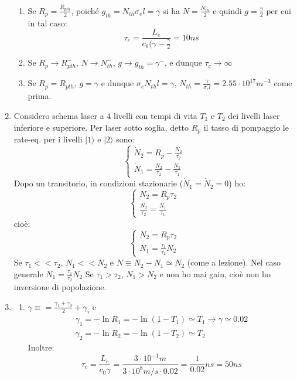 \documentclass{book}
\def \s {\sigma}
\newcommand{\lv}[1]{$|#1\rangle$}
\theoremstyle{remark}
\begin{document}
\begin{enumerate}
\begin{enumerate}
\item Se $R_p = \frac{R_{p th}}{2}$, poiché $g_{th} = N_{th} \s_e l = \gamma$ si ha $N = \frac{N_{th}}{2}$ e quindi $g =\frac{\gamma}{2}$ per cui in tal caso:
\begin{equation*}
\tau_c = \frac{L_e}{c_0(\gamma - \frac{\gamma}{2}} = 10 ns
\end{equation*}
\item Se $R_p \rightarrow R_{p th}^-$, $N\rightarrow N_{th}^-$, $g \rightarrow g_{th} = \gamma^-$, e dunque $\tau_c \rightarrow \infty$ 
\item Se $R_p = R_{p th}$, $g = \gamma$ e dunque $\s_e N_{th}l=\gamma$, $N_{th}=\frac{\gamma}{\s_e l} = 2.55 \cdot 10^{17} m^{-3}$ come prima.
\end{enumerate}

\item Considero schema laser a 4 livelli con tempi di vita $T_1$ e $T_2$ dei livelli laser inferiore e superiore.
Per laser sotto soglia, detto $R_p$ il tasso di pompaggio le rate-eq. per i livelli \lv{1} e \lv{2} sono:
\begin{equation*}
\begin{cases}
\dot{N}_2 = R_p - \frac{N_2}{\tau_2}\\
\dot{N}_1 = \frac{N_2}{\tau_2} - \frac{N_1}{\tau_1}
\end{cases}
\end{equation*}
Dopo un transitorio, in condizioni stazionarie ($\dot{N}_1 = \dot{N}_2 = 0$) ho:
\begin{equation*}
\begin{cases}
N_2 = R_p\tau_2\\
\frac{N_2}{\tau_2} = \frac{N_1}{\tau_1}
\end{cases}
\end{equation*}
cioè:
\begin{equation*}
\begin{cases}
N_2 = R_p\tau_2\\
N_1 = \frac{\tau_1}{\tau_2} N_2
\end{cases}
\end{equation*}
Se $\tau_1 << \tau_2$, $N_1 << N_2$ e $N \equiv N_2 - N_1 \simeq N_2$ (come a lezione).
Nel caso generale $N_1 = \frac{\tau_1}{\tau_2} N_2$ Se $\tau_1 > \tau_2$, $N_1 > N_2$ e non ho mai gain, cioè non ho inversione di popolazione.

\item %
\begin{enumerate}
\item $\gamma \equiv = \frac{\gamma_1 + \gamma_2}{2} + \gamma_i$ e
\begin{align*}
\gamma_1 = -\ln R_1 = -\ln (1-T_1) \simeq T_1 \rightarrow \gamma \simeq 0.02\\
\gamma_2 = -\ln R_2 = -\ln (1 -T_2) \simeq T_2
\end{align*}
Inoltre:
\begin{equation*}
\tau_c = \frac{L_e}{c_0 \gamma} = \frac{3\cdot 10^{-1} m}{3 \cdot 10^8 m/s \cdot 0.02} = \frac{1}{0.02} ns = 50 ns
\end{equation*}


\end{enumerate}
\end{enumerate}
\end{document}
